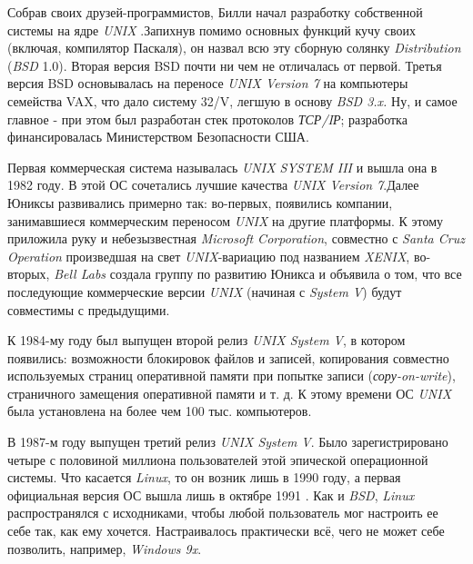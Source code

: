 Собрав своих друзей-программистов, Билли начал разработку собственной системы на ядре \textit{UNIX} .Запихнув помимо основных функций кучу своих (включая, компилятор Паскаля), он назвал всю эту сборную солянку \textit{Distribution} (\textit{BSD} 1.0). Вторая версия BSD почти ни чем не отличалась от первой. Третья версия BSD основывалась на переносе \textit{UNIX Version 7} на компьютеры семейства VAX, что дало систему 32/V, легшую в основу \textit{BSD 3.x.} Ну, и самое главное - при этом был разработан стек протоколов \textit{ТСР/IР}; разработка финансировалась Министерством Безопасности США.

Первая коммерческая система называлась \textit{UNIX SYSTEM III} и вышла она в 1982 году. В этой ОС сочетались лучшие качества \textit{UNIX Version 7}.Далее Юниксы развивались примерно так: во-первых, появились компании, занимавшиеся коммерческим переносом \textit{UNIX} на другие платформы. К этому приложила руку и небезызвестная \textit{Microsoft Corporation}, совместно с \textit{Santa Cruz Operation} произведшая на свет \textit{UNIX}-вариацию под названием \textit{XENIX}, во-вторых,\textit{ Bell Labs} создала группу по развитию Юникса и объявила о том, что все последующие коммерческие версии \textit{UNIX} (начиная с \textit{System V}) будут совместимы с предыдущими.

К 1984-му году был выпущен второй релиз \textit{UNIX System V}, в котором появились: возможности блокировок файлов и записей, копирования совместно используемых страниц оперативной памяти при попытке записи (\textit{сору-on-write}), страничного замещения оперативной памяти и т. д. К этому времени ОС \textit{UNIX} была установлена на более чем 100 тыс. компьютеров.

В 1987-м году выпущен третий релиз \textit{UNIX System V}. Было зарегистрировано четыре с половиной миллиона пользователей этой эпической операционной системы. Что касается \textit{Linux}, то он возник лишь в 1990 году, а первая официальная версия ОС вышла лишь в октябре 1991 . Как и \textit{BSD}, \textit{Linux} распространялся с исходниками, чтобы любой пользователь мог настроить ее себе так, как ему хочется. Настраивалось практически всё, чего не может себе позволить, например, \textit{Windows 9x}.


